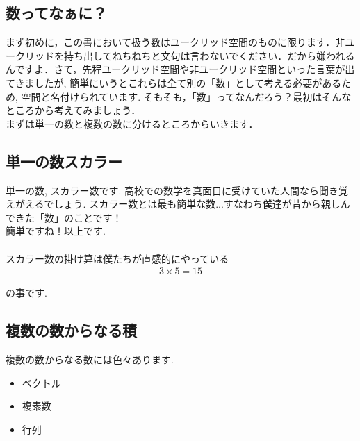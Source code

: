 \documentclass[11pt,a4paper]{jreport}
\begin{document}
\subsection{数ってなぁに？}
まず初めに，この書において扱う数はユークリッド空間のものに限ります．非ユークリッドを持ち出してねちねちと文句は言わないでください．だから嫌われるんですよ．さて，先程ユークリッド空間や非ユークリッド空間といった言葉が出てきましたが, 簡単にいうとこれらは全て別の「数」として考える必要があるため, 空間と名付けられています. そもそも，「数」ってなんだろう？最初はそんなところから考えてみましょう．\\
まずは単一の数と複数の数に分けるところからいきます．\\

\subsection{単一の数スカラー}
単一の数, スカラー数です. 高校での数学を真面目に受けていた人間なら聞き覚えがえるでしょう. スカラー数とは最も簡単な数...すなわち僕達が昔から親しんできた「数」のことです！\\
簡単ですね！以上です.\\
\\
スカラー数の掛け算は僕たちが直感的にやっている
\begin{eqnarray}
3 × 5 = 15
\end{eqnarray}

の事です.
\\

\subsection{複数の数からなる積}
複数の数からなる数には色々あります.\\
\begin{itemize}
 \item ベクトル
 \item 複素数
 \item 行列
\end{itemize}
\end{document}
